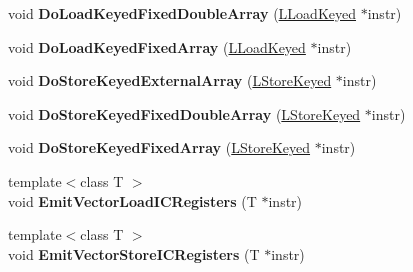 \begin{DoxyCompactItemize}
\item 
void {\bfseries Do\+Load\+Keyed\+Fixed\+Double\+Array} (\hyperlink{classv8_1_1internal_1_1_l_load_keyed}{L\+Load\+Keyed} $\ast$instr)\hypertarget{classv8_1_1internal_1_1_l_code_gen_aa7b2c7080c1f9724950a1a7c83e0a0ba}{}\label{classv8_1_1internal_1_1_l_code_gen_aa7b2c7080c1f9724950a1a7c83e0a0ba}

\item 
void {\bfseries Do\+Load\+Keyed\+Fixed\+Array} (\hyperlink{classv8_1_1internal_1_1_l_load_keyed}{L\+Load\+Keyed} $\ast$instr)\hypertarget{classv8_1_1internal_1_1_l_code_gen_aec64c3b23ea28f8a563d436fa0bc39f3}{}\label{classv8_1_1internal_1_1_l_code_gen_aec64c3b23ea28f8a563d436fa0bc39f3}

\item 
void {\bfseries Do\+Store\+Keyed\+External\+Array} (\hyperlink{classv8_1_1internal_1_1_l_store_keyed}{L\+Store\+Keyed} $\ast$instr)\hypertarget{classv8_1_1internal_1_1_l_code_gen_ac194b20beddd01650a1534290eb6c41f}{}\label{classv8_1_1internal_1_1_l_code_gen_ac194b20beddd01650a1534290eb6c41f}

\item 
void {\bfseries Do\+Store\+Keyed\+Fixed\+Double\+Array} (\hyperlink{classv8_1_1internal_1_1_l_store_keyed}{L\+Store\+Keyed} $\ast$instr)\hypertarget{classv8_1_1internal_1_1_l_code_gen_af87a3bb48b2b2ce3880ca8aacf62b397}{}\label{classv8_1_1internal_1_1_l_code_gen_af87a3bb48b2b2ce3880ca8aacf62b397}

\item 
void {\bfseries Do\+Store\+Keyed\+Fixed\+Array} (\hyperlink{classv8_1_1internal_1_1_l_store_keyed}{L\+Store\+Keyed} $\ast$instr)\hypertarget{classv8_1_1internal_1_1_l_code_gen_a126ac600bb5f30c98bef6e57a096d9a9}{}\label{classv8_1_1internal_1_1_l_code_gen_a126ac600bb5f30c98bef6e57a096d9a9}

\item 
{\footnotesize template$<$class T $>$ }\\void {\bfseries Emit\+Vector\+Load\+I\+C\+Registers} (T $\ast$instr)\hypertarget{classv8_1_1internal_1_1_l_code_gen_a31e396d22475d9c9dec1ac0e5030380a}{}\label{classv8_1_1internal_1_1_l_code_gen_a31e396d22475d9c9dec1ac0e5030380a}

\item 
{\footnotesize template$<$class T $>$ }\\void {\bfseries Emit\+Vector\+Store\+I\+C\+Registers} (T $\ast$instr)\hypertarget{classv8_1_1internal_1_1_l_code_gen_a84c9b0e87f89361233a5c74e43d689cb}{}\label{classv8_1_1internal_1_1_l_code_gen_a84c9b0e87f89361233a5c74e43d689cb}


\end{DoxyCompactItemize}
